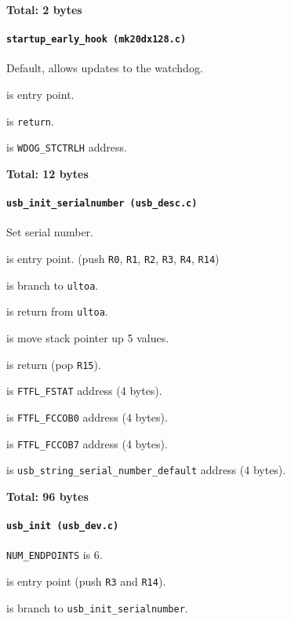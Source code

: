 \textbf{Total: 2 bytes}

\paragraph{\texttt{startup\_early\_hook (mk20dx128.c)}} Default, allows updates
to the watchdog.

 is entry point.

 is \texttt{return}.

 is \texttt{WDOG\_STCTRLH} address.

\textbf{Total: 12 bytes}

\paragraph{\texttt{usb\_init\_serialnumber (usb\_desc.c)}} Set serial number.

 is entry point.
(push \texttt{R0}, \texttt{R1}, \texttt{R2}, \texttt{R3},
\texttt{R4}, \texttt{R14})

 is branch to \texttt{ultoa}.

 is return from \texttt{ultoa}.

 is move stack pointer up 5 values.

 is return (pop \texttt{R15}).

\vspace{1em}

 is \texttt{FTFL\_FSTAT} address (4 bytes).

 is \texttt{FTFL\_FCCOB0} address (4 bytes).

 is \texttt{FTFL\_FCCOB7} address (4 bytes).

 is {\tiny
\texttt{usb\_string\_serial\_number\_default}} address (4 bytes).

\textbf{Total: 96 bytes}

\paragraph{\texttt{usb\_init (usb\_dev.c)}} \texttt{NUM\_ENDPOINTS} is 6.

 is entry point (push \texttt{R3} and \texttt{R14}).

 is branch to \texttt{usb\_init\_serialnumber}.

